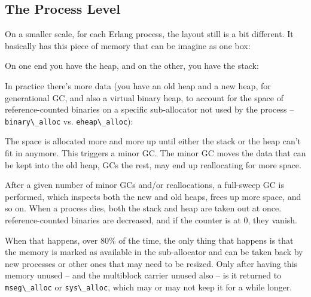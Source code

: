 \documentclass[11pt, oneside]{book}   	%
\newcommand{\term}[1]{\Verb`#1`}
\begin{document}
\subsection{The Process Level}
\label{subsec:memory-process-level}

On a smaller scale, for each Erlang process, the layout still is a bit different. It basically has this piece of memory that can be imagine as one box:

\begin{VerbatimText}
[                  ]
\end{VerbatimText}

On one end you have the heap, and on the other, you have the stack:

\begin{VerbatimText}
\end{VerbatimText}

In practice there's more data (you have an old heap and a new heap, for generational GC, and also a virtual binary heap, to account for the space of reference-counted binaries on a specific sub-allocator not used by the process -- \term{binary\_alloc} vs. \term{eheap\_alloc}):

\begin{VerbatimText}
\end{VerbatimText}

The space is allocated more and more up until either the stack or the heap can't fit in anymore. This triggers a minor GC. The minor GC moves the data that can be kept into the old heap, GCs the rest, may end up reallocating for more space.

After a given number of minor GCs and/or reallocations, a full-sweep GC is performed, which inspects both the new and old heaps, frees up more space, and so on. When a process dies, both the stack and heap are taken out at once. reference-counted binaries are decreased, and if the counter is at 0, they vanish.

When that happens, over 80\% of the time, the only thing that happens is that the memory is marked as available in the sub-allocator and can be taken back by new processes or other ones that may need to be resized. Only after having this memory unused -- and the multiblock carrier unused also -- is it returned to \term{mseg\_alloc} or \term{sys\_alloc}, which may or may not keep it for a while longer.
\end{document}
